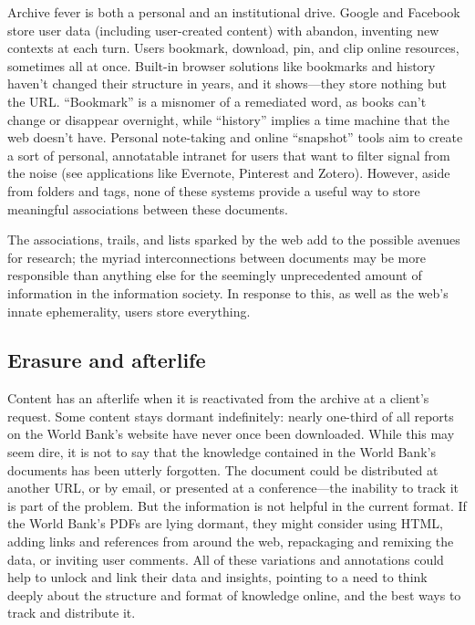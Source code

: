 Archive fever is both a personal and an institutional drive. Google and Facebook store user data (including user-created content) with abandon, inventing new contexts at each turn. Users bookmark, download, pin, and clip online resources, sometimes all at once. Built-in browser solutions like bookmarks and history haven't changed their structure in years, and it shows---they store nothing but the URL. ``Bookmark'' is a misnomer of a remediated word, as books can't change or disappear overnight, while ``history'' implies a time machine that the web doesn't have. Personal note-taking and online ``snapshot'' tools aim to create a sort of personal, annotatable intranet for users that want to filter signal from the noise (see applications like Evernote, Pinterest and Zotero). However, aside from folders and tags, none of these systems provide a useful way to store meaningful associations between these documents.

The associations, trails, and lists sparked by the web add to the possible avenues for research; the myriad interconnections between documents may be more responsible than anything else for the seemingly unprecedented amount of information in the information society. In response to this, as well as the web's innate ephemerality, users store everything.

\subsection{Erasure and afterlife}

Content has an afterlife when it is reactivated from the archive at a client's request. Some content stays dormant indefinitely: nearly one-third of all reports on the World Bank's website have never once been downloaded.\autocite{trevino_which_2014} While this may seem dire, it is not to say that the knowledge contained in the World Bank's documents has been utterly forgotten. The document could be distributed at another URL, or by email, or presented at a conference---the inability to track it is part of the problem. But the information is not helpful in the current format. If the World Bank's PDFs are lying dormant, they might consider using HTML, adding links and references from around the web, repackaging and remixing the data, or inviting user comments. All of these variations and annotations could help to unlock and link their data and insights, pointing to a need to think deeply about the structure and format of knowledge online, and the best ways to track and distribute it.

